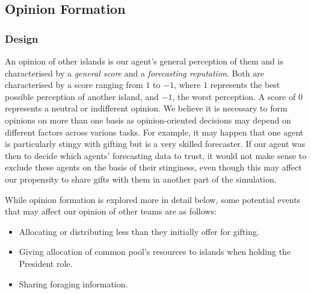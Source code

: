 \subsection{Opinion Formation}
\label{subsec: opinion-formation}
\subsubsection{Design}
An opinion of other islands is our agent's general perception of them and is characterised by a \textit{general score} and a \textit{forecasting reputation}. Both are characterised by a score ranging from $1$ to $-1$, where $1$ represents the best possible perception of another island, and $-1$, the worst perception. A score of $0$ represents a neutral or indifferent opinion. We believe it is necessary to form opinions on more than one basis as opinion-oriented decisions may depend on different factors across various tasks. For example, it may happen that one agent is particularly stingy with gifting but is a very skilled forecaster. If our agent was then to decide which agents' forecasting data to trust, it would not make sense to exclude these agents on the basis of their stinginess, even though this may affect our propensity to share gifts with them in another part of the simulation.

While opinion formation is explored more in detail below, some potential events that may affect our opinion of other teams are as follows:
\begin{itemize}
    \item Allocating or distributing less than they initially offer for gifting.
    \item Giving allocation of common pool's resources to islands when holding the President role. 
    \item Sharing foraging information.
\end{itemize}

